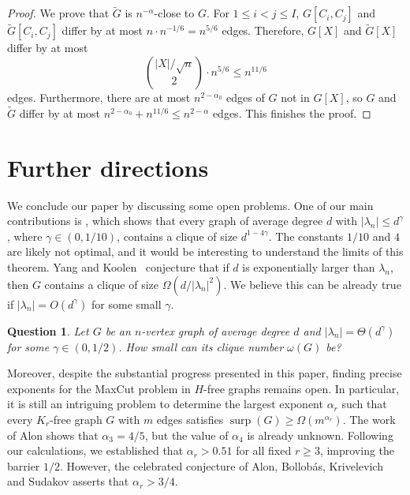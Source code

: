 \documentclass[11pt]{article}
\theoremstyle{plain}
\newtheorem{question}[theorem]{Question}
\theoremstyle{definition}
\DeclareMathOperator{\surp}{surp}
\begin{document}
\begin{proof}
    We prove that $\widetilde{G}$ is $n^{-\alpha}$-close to $G$. For $1\leq i<j\leq I$, $G[C_i,C_j]$ and $\widetilde{G}[C_i,C_j]$ differ by at most $n\cdot n^{-1/6}=n^{5/6}$ edges.
    Therefore, $G[X]$ and $\widetilde{G}[X]$ differ by at most $$\binom{|X|/\sqrt{n}}{2}\cdot n^{5/6}\leq n^{11/6}$$
    edges. 
    Furthermore, there are at most $n^{2-\alpha_0}$ edges of $G$ not in $G[X]$, so $G$ and $\widetilde{G}$ differ by at most $n^{2-\alpha_0}+n^{11/6}\leq n^{2-\alpha}$ edges. 
    This finishes the proof.
\end{proof}

\section{Further directions}

We conclude our paper by discussing some open problems. One of our main contributions is , which shows that every graph of average degree $d$ with $|\lambda_n|\leq d^\gamma$, where $\gamma\in (0, 1/10)$, contains a clique of size $d^{1-4\gamma}$.
The constants $1/10$ and $4$ are likely not optimal, and it would be interesting to understand the limits of this theorem.  
Yang and Koolen~\cite{YK} conjecture that if $d$ is exponentially larger than $\lambda_n$, then $G$ contains a clique of size $\Omega(d/|\lambda_n|^2)$. We believe this can be already true if  $|\lambda_n|=O(d^\gamma)$ for some small $\gamma$.

\begin{question}
    Let $G$ be an $n$-vertex graph of average degree $d$ and $|\lambda_n| = \Theta(d^\gamma)$ for some $\gamma\in (0, 1/2)$.
    How small can its clique number $\omega(G)$ be? 
\end{question}

Moreover, despite the substantial progress presented in this paper, finding precise exponents for the MaxCut problem in $H$-free graphs remains open. In particular, it is still an intriguing problem to determine the largest exponent $\alpha_r$ such that every $K_r$-free graph $G$ with $m$ edges satisfies $\surp(G)\geq \Omega(m^{\alpha_r})$. The work of Alon \cite{AlonMaxCut} shows that $\alpha_3=4/5$, but the value of $\alpha_4$ is already unknown. Following our calculations, we established that $\alpha_r>0.51$ for all fixed $r \ge 3$, improving the barrier $1/2$. However, the celebrated conjecture of Alon, Bollob\'as, Krivelevich and Sudakov \cite{ABKS} asserts that $\alpha_r>3/4$.
\end{document}
